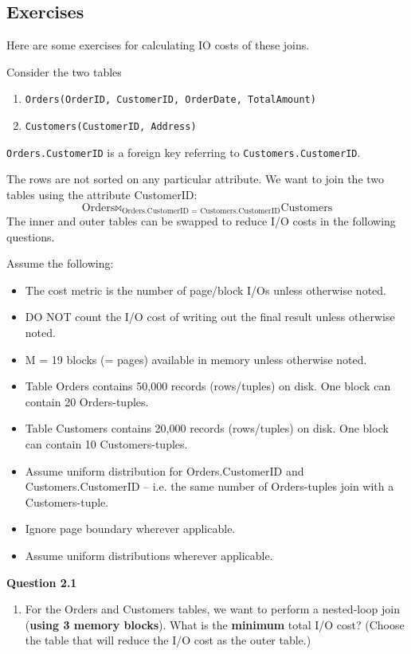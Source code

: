 \subsection{Exercises} 

  Here are some exercises for calculating IO costs of these joins. 

  \begin{example}
    Consider the two tables
    \begin{enumerate}
      \item \texttt{Orders(OrderID, CustomerID, OrderDate, TotalAmount)} 
      \item \texttt{Customers(CustomerID, Address)}
    \end{enumerate}
    \texttt{Orders.CustomerID} is a foreign key referring to \texttt{Customers.CustomerID}.

    The rows are not sorted on any particular attribute. We want to join the two tables using the attribute CustomerID:
    \[
    \text{Orders} \bowtie_{\text{Orders.CustomerID = Customers.CustomerID}} \text{Customers}
    \]
    The inner and outer tables can be swapped to reduce I/O costs in the following questions.

    Assume the following:
    \begin{itemize}
      \item The cost metric is the number of page/block I/Os unless otherwise noted.
      \item DO NOT count the I/O cost of writing out the final result unless otherwise noted.
      \item M = 19 blocks (= pages) available in memory unless otherwise noted.
      \item Table Orders contains 50,000 records (rows/tuples) on disk. One block can contain 20 Orders-tuples.
      \item Table Customers contains 20,000 records (rows/tuples) on disk. One block can contain 10 Customers-tuples.
      \item Assume uniform distribution for Orders.CustomerID and Customers.CustomerID -- i.e. the same number of Orders-tuples join with a Customers-tuple.
      \item Ignore page boundary wherever applicable.
      \item Assume uniform distributions wherever applicable.
    \end{itemize}

    \vspace{1em}
    \noindent\textbf{Question 2.1}
    \begin{enumerate}[label=(\alph*)]
      \item For the Orders and Customers tables, we want to perform a nested-loop join (\textbf{using 3 memory blocks}). What is the \textbf{minimum} total I/O cost? (Choose the table that will reduce the I/O cost as the outer table.)
      

\end{enumerate}
\end{example}

